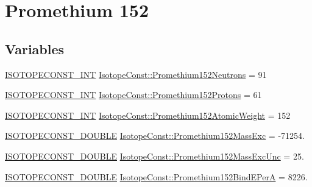 \hypertarget{group___isotope_const-_promethium-_pm152}{}\section{Promethium 152}
\label{group___isotope_const-_promethium-_pm152}
\subsection*{Variables}
\begin{DoxyCompactItemize}
\item 
\mbox{\hyperlink{group___isotope_const-_macros_ga5f18360b3e99483a35c32d789e62621c}{I\+S\+O\+T\+O\+P\+E\+C\+O\+N\+S\+T\+\_\+\+I\+NT}} \mbox{\hyperlink{group___isotope_const-_promethium-_pm152_gaed8b6e0a0dec3fde75bb967154944006}{Isotope\+Const\+::\+Promethium152\+Neutrons}} = 91
\item 
\mbox{\hyperlink{group___isotope_const-_macros_ga5f18360b3e99483a35c32d789e62621c}{I\+S\+O\+T\+O\+P\+E\+C\+O\+N\+S\+T\+\_\+\+I\+NT}} \mbox{\hyperlink{group___isotope_const-_promethium-_pm152_ga1587f5c91c41f50cf4bb3e69c011e04b}{Isotope\+Const\+::\+Promethium152\+Protons}} = 61
\item 
\mbox{\hyperlink{group___isotope_const-_macros_ga5f18360b3e99483a35c32d789e62621c}{I\+S\+O\+T\+O\+P\+E\+C\+O\+N\+S\+T\+\_\+\+I\+NT}} \mbox{\hyperlink{group___isotope_const-_promethium-_pm152_gaf9084b9627ff0f5145c46976ba8dfa97}{Isotope\+Const\+::\+Promethium152\+Atomic\+Weight}} = 152
\item 
\mbox{\hyperlink{group___isotope_const-_macros_ga8f45a7272ce02c0b4c65c44636ed719a}{I\+S\+O\+T\+O\+P\+E\+C\+O\+N\+S\+T\+\_\+\+D\+O\+U\+B\+LE}} \mbox{\hyperlink{group___isotope_const-_promethium-_pm152_gab63815025d92327d25de33e91cf5fcb5}{Isotope\+Const\+::\+Promethium152\+Mass\+Exc}} = -\/71254.
\item 
\mbox{\hyperlink{group___isotope_const-_macros_ga8f45a7272ce02c0b4c65c44636ed719a}{I\+S\+O\+T\+O\+P\+E\+C\+O\+N\+S\+T\+\_\+\+D\+O\+U\+B\+LE}} \mbox{\hyperlink{group___isotope_const-_promethium-_pm152_gaffb2bf2ca3be55d0dfc4396bdf692f6a}{Isotope\+Const\+::\+Promethium152\+Mass\+Exc\+Unc}} = 25.
\item 
\mbox{\hyperlink{group___isotope_const-_macros_ga8f45a7272ce02c0b4c65c44636ed719a}{I\+S\+O\+T\+O\+P\+E\+C\+O\+N\+S\+T\+\_\+\+D\+O\+U\+B\+LE}} \mbox{\hyperlink{group___isotope_const-_promethium-_pm152_ga413655a4e3236b0a357c772fccaa9157}{Isotope\+Const\+::\+Promethium152\+Bind\+E\+PerA}} = 8226.

\end{DoxyCompactItemize}
